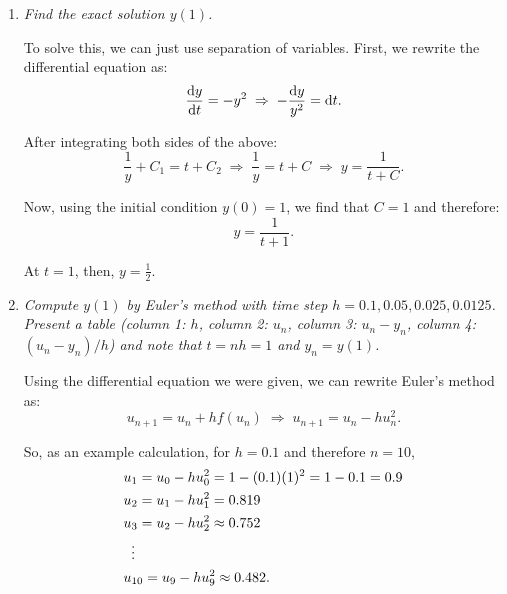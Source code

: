 \begin{enumerate}[label=(\alph*)]

    \item \textit{Find the exact solution $y(1)$.}
      \vspace{1em}

      To solve this, we can just use separation of variables. First, we rewrite the differential equation as:
      \begin{equation*}
        \dv{y}{t} = -y^{2} \;\Rightarrow\; -\frac{\mathrm{d}y}{y^{2}} = \mathrm{d}t.
      \end{equation*}

      After integrating both sides of the above:
      \begin{equation*}
        \frac{1}{y} + C_{1} = t + C_{2} \;\Rightarrow\; \frac{1}{y} = t+C \;\Rightarrow\; y = \frac{1}{t+C}.
      \end{equation*}

      Now, using the initial condition $y(0)=1$, we find that $C=1$ and therefore:
      \begin{equation*}
        y=\frac{1}{t+1}.
      \end{equation*}

      At $t=1$, then, $\boxed{y=\frac{1}{2}}$.

    \item \textit{Compute $y(1)$ by Euler's method with time step $h = 0.1, 0.05, 0.025, 0.0125$. Present a table (column 1: $h$, column 2: $u_{n}$, column 3: $u_{n}-y_{n}$, column 4: $(u_{n} - y_{n})/h$) and note that $t=nh=1$ and $y_{n}=y(1)$.}
      \vspace{1em}
    
      Using the differential equation we were given, we can rewrite Euler's method as:
      \begin{equation*}
        u_{n+1} = u_{n}+hf(u_{n}) \;\Rightarrow\; u_{n+1} = u_{n}-hu_{n}^2.
      \end{equation*}

      So, as an example calculation, for $h=0.1$ and therefore $n=10$,
      \begin{align*}
        &u_{1} = u_{0}-hu_{0}^2 = 1-(0.1)(1)^{2} = 1-0.1 = 0.9 \\
        &u_{2} = u_{1}-hu_{1}^{2} = 0.819 \\
        &u_{3} = u_{2}-hu_{2}^{2} \approx 0.752 \\
        &\;\;\vdots \notag \\
        &u_{10} = u_{9}-hu_{9}^{2} \approx 0.482.
      \end{align*}


\end{enumerate}
